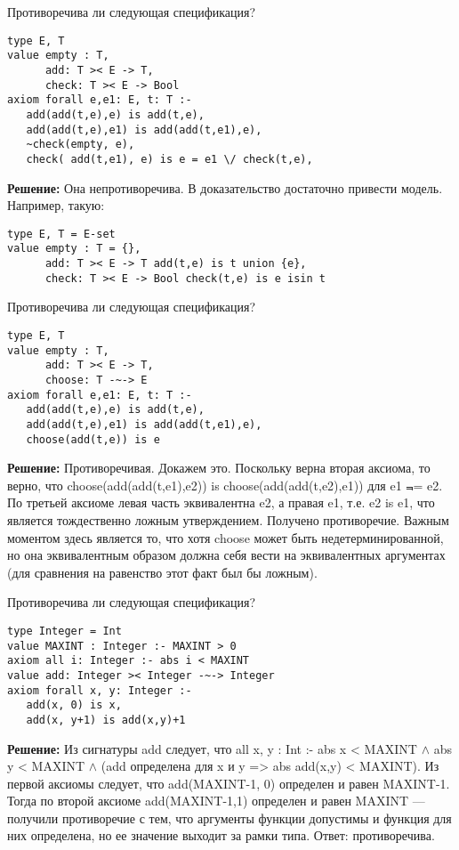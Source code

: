 \z Противоречива ли следующая спецификация?
\begin{lstlisting}
type E, T
value empty : T,
      add: T >< E -> T,
      check: T >< E -> Bool
axiom forall e,e1: E, t: T :-
   add(add(t,e),e) is add(t,e),
   add(add(t,e),e1) is add(add(t,e1),e),
   ~check(empty, e),
   check( add(t,e1), e) is e = e1 \/ check(t,e),
\end{lstlisting}

\textbf{Решение:}
Она непротиворечива. В доказательство достаточно привести модель. Например, такую:
\begin{lstlisting}
type E, T = E-set
value empty : T = {},
      add: T >< E -> T add(t,e) is t union {e},
      check: T >< E -> Bool check(t,e) is e isin t
\end{lstlisting}

\z Противоречива ли следующая спецификация?
\begin{lstlisting}
type E, T
value empty : T,
      add: T >< E -> T,
      choose: T -~-> E
axiom forall e,e1: E, t: T :-
   add(add(t,e),e) is add(t,e),
   add(add(t,e),e1) is add(add(t,e1),e),
   choose(add(t,e)) is e
\end{lstlisting}

\textbf{Решение:}
Противоречивая. Докажем это. Поскольку верна вторая аксиома, то верно, что choose(add(add(t,e1),e2)) is choose(add(add(t,e2),e1)) для e1 $\Not$= e2. По третьей аксиоме левая часть эквивалентна e2, а правая e1, т.е. e2 is e1, что является тождественно ложным утверждением. Получено противоречие. Важным моментом здесь является то, что хотя choose может быть недетерминированной, но она эквивалентным образом должна себя вести на эквивалентных аргументах (для сравнения на равенство этот факт был бы ложным).

\z Противоречива ли следующая спецификация?
\begin{lstlisting}
type Integer = Int
value MAXINT : Integer :- MAXINT > 0
axiom all i: Integer :- abs i < MAXINT
value add: Integer >< Integer -~-> Integer
axiom forall x, y: Integer :-
   add(x, 0) is x,
   add(x, y+1) is add(x,y)+1
\end{lstlisting}

\textbf{Решение:}
Из сигнатуры add следует, что all x, y : Int :- abs x < MAXINT $\wedge$ abs y < MAXINT $\wedge$ (add определена для x и y => abs add(x,y) < MAXINT). Из первой аксиомы следует, что add(MAXINT-1, 0) определен и равен MAXINT-1. Тогда по второй аксиоме add(MAXINT-1,1) определен и равен MAXINT --- получили противоречие с тем, что аргументы функции допустимы и функция для них определена, но ее значение выходит за рамки типа. Ответ: противоречива.

